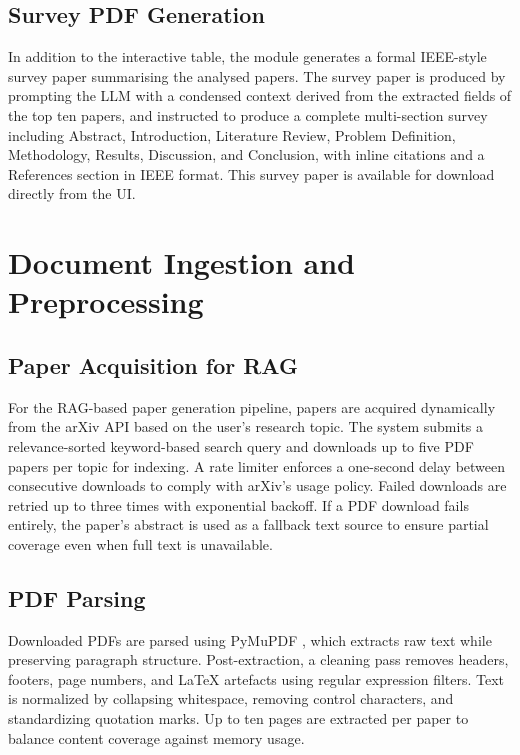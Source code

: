 \documentclass[12pt, a4paper]{article}
\begin{document}
\subsection{Survey PDF Generation}

In addition to the interactive table, the module generates a formal IEEE-style
survey paper summarising the analysed papers. The survey paper is produced by
prompting the LLM with a condensed context derived from the extracted fields of
the top ten papers, and instructed to produce a complete multi-section survey
including Abstract, Introduction, Literature Review, Problem Definition,
Methodology, Results, Discussion, and Conclusion, with inline citations and a
References section in IEEE format. This survey paper is available for download
directly from the UI.

\section{Document Ingestion and Preprocessing}

\subsection{Paper Acquisition for RAG}

For the RAG-based paper generation pipeline, papers are acquired dynamically from
the arXiv API \cite{arxiv2024} based on the user's research topic. The system
submits a relevance-sorted keyword-based search query and downloads up to five PDF
papers per topic for indexing. A rate limiter enforces a one-second delay between
consecutive downloads to comply with arXiv's usage policy. Failed downloads are
retried up to three times with exponential backoff. If a PDF download fails
entirely, the paper's abstract is used as a fallback text source to ensure partial
coverage even when full text is unavailable.

\subsection{PDF Parsing}

Downloaded PDFs are parsed using PyMuPDF \cite{pymupdf2024}, which extracts
raw text while preserving paragraph structure. Post-extraction, a cleaning pass
removes headers, footers, page numbers, and \LaTeX{} artefacts using regular
expression filters. Text is normalized by collapsing whitespace, removing control
characters, and standardizing quotation marks. Up to ten pages are extracted per
paper to balance content coverage against memory usage.
\end{document}
